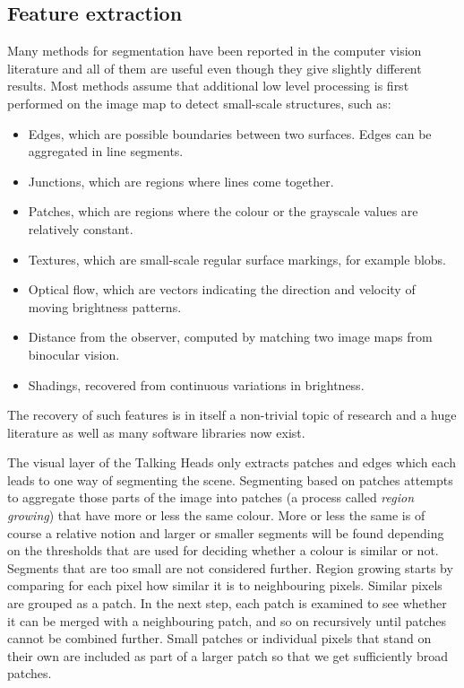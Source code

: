 \subsection{Feature extraction}

Many methods for segmentation have been reported 
in the computer vision literature and all of them are useful even though they 
give slightly different results. Most methods assume 
that additional low level processing is first performed 
on the image map to detect small-scale structures, such as: 
\begin{itemize}
\item Edges, which are possible boundaries between two 
surfaces. Edges can be aggregated in line segments. 
\item Junctions, which are regions where lines come 
together. 
\item Patches, which are regions where the colour or
the grayscale values are relatively constant. 
\item Textures, which are small-scale regular surface 
markings, for example blobs. 
\item Optical flow, which are vectors indicating the 
direction and velocity of moving brightness patterns. 
\item Distance from the observer, computed by
matching two image maps from binocular vision. 
\item Shadings, recovered from continuous variations in
brightness. 
\end{itemize}
The recovery of such features is in itself 
a non-trivial topic of research and a huge literature as well as 
many software libraries now exist.

The visual layer of the Talking Heads only extracts 
patches and edges which each leads to one way 
of segmenting the scene. 
Segmenting based on patches attempts to aggregate 
those parts of the image into patches (a process
called {\itshape region growing}) that have more or less the same 
colour. More or less the same is of course a relative
notion and larger or smaller segments will be found
depending on the thresholds that are used for 
deciding whether a colour is similar or not. Segments
that are too small are not considered further. 
Region growing starts by comparing for each pixel how similar it is to 
neighbouring pixels. Similar pixels
are grouped as a patch. In the next step, each patch
is examined to see whether it can be merged with
a neighbouring patch, and so on recursively until 
patches cannot be combined further. Small patches or individual pixels that 
stand on their own are included as part of a larger
patch so that we get sufficiently broad patches. 

